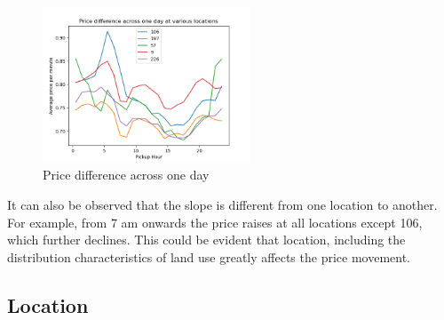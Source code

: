 \documentclass[11pt]{article}
\begin{document}
\begin{figure}[h]
    \includegraphics[width=0.55\textwidth]{plots/Price_across_one_day.png}
    \centering
    \caption{Price difference across one day}
    \label{PD_one_day}
\end{figure}

It can also be observed that the slope is different from one location to another. For example, from 7 am onwards the price raises at all locations except 106, which further declines. This could be evident that location, including the distribution characteristics of land use greatly affects the price movement. 

\subsection{Location}
\end{document}
